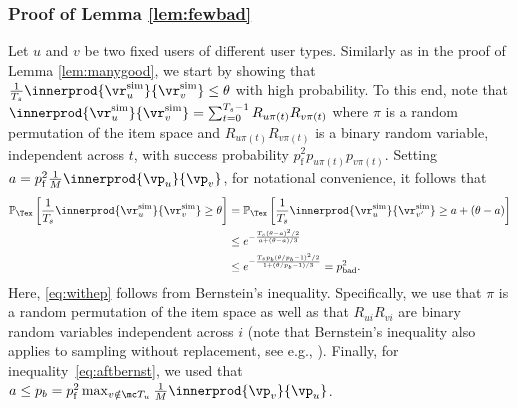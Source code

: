 \documentclass{article}
\newcommand\pf{p_{\mathrm{f}}}
\newcommand{\vratingS}{\vocrating^{\text{sim}}}
\newcommand\vocrating{\vr}
\newcommand\ocR{R}
\renewcommand\PR[2][\Tex]{
\ifthenelse{\equal{#1}{}}{{\mathbb P}\left[#2\right]}{\ensuremath{{\mathbb P}_{#1}\left[ #2\right]}}}
\begin{document}
\subsubsection{Proof of Lemma \ref{lem:fewbad}}
Let $u$ and $v$ be two fixed users of different user types. 
Similarly as in the proof of Lemma \ref{lem:manygood}, 
we start by showing that $\frac{1}{T_s}\innerprod{\vratingS_u }{\vratingS_v} \leq \theta$ with high probability. 
To this end, note that $\innerprod{\vratingS_u }{\vratingS_v}
= \sum_{t=0}^{T_s-1} 
\ocR_{u \pi(t)} \ocR_{v \pi(t)}
$ where $\pi$ is a random permutation of the item space and $\ocR_{u \pi(t)} \ocR_{v \pi(t)}$ is a binary random variable, independent across $t$, with success probability $\pf^2 p_{u \pi(t)} p_{v \pi(t)}$. 
Setting $a = \pf^2 \frac{1}{M} \innerprod{\vp_u}{\vp_v}$, for notational convenience, 
it follows that 
\begin{align}
\PR{ \frac{1}{T_s} \innerprod{\vratingS_u }{\vratingS_v}    \geq \theta }
%
&=\PR{ \frac{1}{T_s} \innerprod{\vratingS_u }{\vratingS_{v'}}    \geq  a  + (\theta - a) } \nonumber \\
%
&
\leq e^{ - 
\frac{T_s (\theta - a)^2 /2}{ a + (\theta - a)/3 } 
} \label{eq:withep} \\
%
&\leq e^{ - 
\frac{T_s p_b (\theta/p_b - 1)^2 /2}{ 1 + (\theta/p_b - 1)/3 } 
}  = \perrb^2  . \label{eq:aftbernst}
\end{align}
Here, \eqref{eq:withep} follows from Bernstein's inequality. Specifically, we use that $\pi$ is a random permutation of the item space as well as that $\ocR_{u i} \ocR_{v i}$ are binary random variables independent across $i$ (note that Bernstein's inequality also applies to sampling without replacement, see e.g., \cite{bardenet_concentration_2015}). 
Finally, for inequality~\eqref{eq:aftbernst}, we used that $a\leq p_b = \pf^2 \max_{v \notin \mc T_u} \frac{1}{M} \innerprod{\vp_v}{\vp_u}$. 

\end{document}
